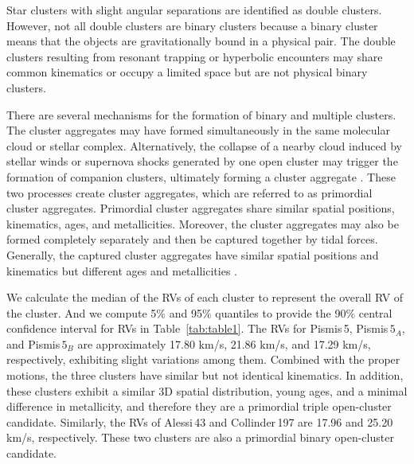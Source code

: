 \documentclass{aa} %
\begin{document}
Star clusters with slight angular separations are identified as double clusters. However, not all 
double clusters are binary clusters because a binary cluster means that the objects are gravitationally 
bound in a physical pair. The double clusters resulting from resonant trapping or hyperbolic 
encounters may share common kinematics or occupy a limited space but are not physical 
binary clusters. %


There are several mechanisms for the formation of binary and multiple clusters. The cluster aggregates may have formed simultaneously in the same molecular cloud or stellar complex. Alternatively, the collapse of a nearby cloud induced by stellar winds or supernova shocks generated by one open cluster may trigger the formation of companion clusters, ultimately forming a cluster aggregate \citep{2021A&A...649A..54P}. These two processes create cluster aggregates, which are referred to as primordial cluster aggregates. Primordial cluster aggregates share similar spatial positions, kinematics, ages, and metallicities. Moreover, the cluster aggregates may also be formed completely separately and then be captured together by tidal forces. Generally, the captured cluster aggregates have similar spatial positions and kinematics but different ages and metallicities \citep{2009A&A...500L..13D}.


We calculate the median of the RVs of each cluster to represent the overall RV of the cluster. 
And we compute 5$\%$ and 95$\%$ quantiles to provide the 90$\%$ central confidence interval for RVs in Table~\ref{tab:table1}. 
The RVs for Pismis\,5, Pismis$\,5_{A}$, and Pismis$\,5_{B}$ are
approximately 17.80 km/s, 21.86 km/s, and 17.29 km/s, respectively, exhibiting slight variations among them. Combined with the proper motions, the 
three clusters have similar but not identical kinematics. In addition, these clusters exhibit a similar 3D spatial distribution, young ages, and a minimal difference in metallicity, and therefore they are a primordial triple open-cluster candidate.
Similarly, the RVs of Alessi\,43 and Collinder\,197 are 17.96 and 25.20 km/s, respectively. 
These two clusters are also a primordial binary open-cluster candidate.
\end{document}
